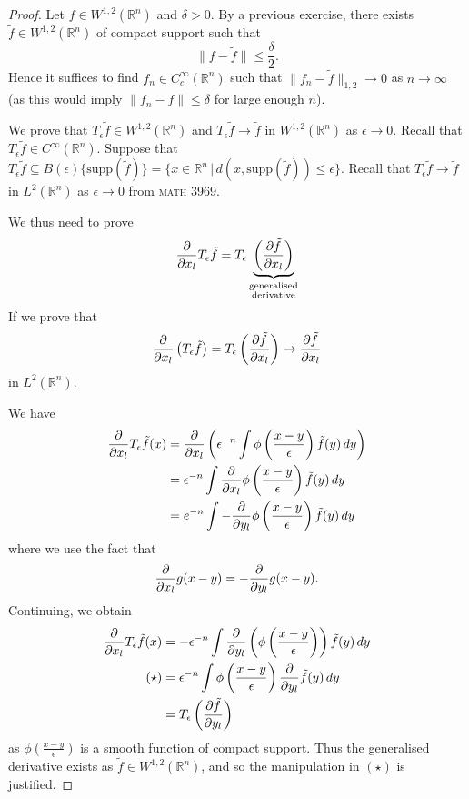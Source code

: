 \documentclass[10pt, oneside, reqno]{amsart}
\theoremstyle{plain}%
\numberwithin{equation}{section}
\theoremstyle{definition}
\theoremstyle{remark}
\newcommand{\given}{ \, | \,}
\newcommand{\R}{\mathbb{R}}
\begin{document}
\begin{proof}
    Let $f \in W^{1, 2}(\R^n)$ and $\delta > 0$.  By a previous exercise, there exists $\tilde f \in W^{1, 2}(\R^n)$ of compact support such that \[
        \| f - \tilde f \| \leq \frac{\delta}{2}.
    \]  Hence it suffices to find $f_n \in C^\infty_c(\R^n)$ such that $\| f_n - \tilde f\|_{1, 2} \rightarrow 0$ as $n \rightarrow \infty$ (as this would imply $\| f_n - f \| \leq \delta$ for large enough $n$).  
    
    We prove that $T_\epsilon \tilde f \in W^{1, 2}(\R^n)$ and $T_\epsilon \tilde f \rightarrow \tilde f$ in $W^{1, 2}(\R^n)$ as $\epsilon \rightarrow 0$.  Recall that $T_\epsilon \tilde f \in C^{\infty}(\R^n)$.  Suppose that $T_\epsilon \tilde f \subseteq B(\epsilon)\{ \text{supp}(\tilde f) \} = \{ x \in \R^n \given d(x, \text{supp}(\tilde f)) \leq \epsilon \}$.  Recall that $T_\epsilon \tilde f \rightarrow \tilde f$ in $L^2(\R^n)$ as $\epsilon \rightarrow 0$ from \textsc{math 3969}.  
    
    We thus need to prove \begin{equation}
        \frac{\partial }{\partial x_l} T_\epsilon \tilde f = T_\epsilon \underbrace{\left( \frac{\partial \tilde f}{\partial x_l} \right)}_{\substack{\text{generalised} \\ \text{derivative}}}
    \end{equation}
  If we prove that \[
        \frac{\partial }{\partial x_l}\left(T_\epsilon \tilde f \right) = T_\epsilon \left(\frac{\partial \tilde f}{\partial x_l} \right) \rightarrow \frac{\partial \tilde f}{\partial x_l}
    \] in $L^2(\R^n)$.  
    
    We have \begin{align*}
        \frac{\partial }{\partial x_l} T_\epsilon \tilde f(x) &= \frac{\partial }{\partial x_l} \left( \epsilon^{-n} \int \phi\left(\frac{x-y}{\epsilon} \right) \tilde f(y) \, dy \right) \\
        &= \epsilon^{-n} \int \frac{\partial }{\partial x_l} \phi\left(\frac{x-y}{\epsilon} \right) \tilde f(y) \, dy \\
        &= e^{-n} \int -\frac{\partial }{\partial y_l} \phi\left( \frac{x-y}{\epsilon} \right) \tilde f(y) \, dy 
    \end{align*} where we use the fact that \[
        \frac{\partial }{\partial x_l}g(x-y) = - \frac{\partial }{\partial y_l} g(x-y).
    \]  Continuing, we obtain \begin{align*}
        \frac{\partial }{\partial x_l} T_\epsilon \tilde f(x)   &= -\epsilon^{-n} \int \frac{\partial }{\partial y_l} \left( \phi\left(\frac{x-y}{\epsilon} \right) \right) \tilde f(y) \, dy \\
        \tag{$\star$}
         &= \epsilon^{-n} \int \phi \left(\frac{x-y}{\epsilon} \right) \frac{\partial }{\partial y_l} \tilde f(y) \, dy \\
        &= T_\epsilon \left( \frac{\partial \tilde f}{\partial  y_l}\right)
    \end{align*} as $\phi\left(\frac{x-y}{\epsilon} \right)$ is a smooth function of compact support.  Thus the generalised derivative exists as $\tilde f \in W^{1, 2}(\R^n)$, and so the manipulation in $(\star)$ is justified.
    
\end{proof}
\end{document}
